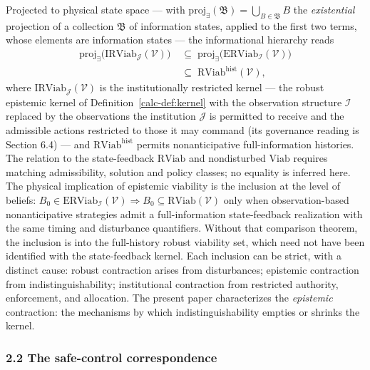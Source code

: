 \documentclass[10pt,twocolumn]{article}
\theoremstyle{definition}
\begin{document}
Projected to physical state space --- with
\(\mathrm{proj}_{\exists}(\mathfrak{B}) = \bigcup_{B \in \mathfrak{B}} B\)
the \emph{existential} projection of a collection \(\mathfrak{B}\) of
information states, applied to the first two terms, whose elements are information states --- the informational hierarchy
reads
\[
\begin{aligned}
\mathrm{proj}_{\exists}\big(\mathrm{IRViab}_{\mathcal{J}}(\mathcal{V})\big)&\;\subseteq\; \mathrm{proj}_{\exists}\big(\mathrm{ERViab}_{\mathcal{I}}(\mathcal{V})\big) \\
&\;\subseteq\; \mathrm{RViab}^{\mathrm{hist}}(\mathcal{V}),
\end{aligned}
\]
where \(\mathrm{IRViab}_{\mathcal{J}}(\mathcal{V})\) is the institutionally restricted kernel --- the robust epistemic kernel of Definition~\ref{calc-def:kernel} with the observation structure \(\mathcal{I}\) replaced by the observations the institution \(\mathcal{J}\) is permitted to receive and the admissible actions restricted to those it may command (its governance reading is Section 6.4) --- and \(\mathrm{RViab}^{\mathrm{hist}}\) permits nonanticipative full-information histories. The relation to the state-feedback \(\mathrm{RViab}\) and nondisturbed \(\mathrm{Viab}\) requires matching admissibility, solution and policy classes; no equality is inferred here. The physical implication of epistemic viability is the
inclusion at the level of beliefs:
\(B_0 \in \mathrm{ERViab}_{\mathcal{I}}(\mathcal{V}) \Rightarrow B_0 \subseteq \mathrm{RViab}(\mathcal{V})\) only when observation-based nonanticipative strategies admit a full-information state-feedback realization with the same timing and disturbance quantifiers. Without that comparison theorem, the inclusion is into the full-history robust viability set, which need not have been identified with the state-feedback kernel.
Each inclusion can be strict, with a distinct cause: robust contraction
arises from disturbances; epistemic contraction from
indistinguishability; institutional contraction from restricted
authority, enforcement, and allocation. The present paper characterizes
the \emph{epistemic} contraction: the mechanisms by which
indistinguishability empties or shrinks the kernel.

\subsubsection{2.2 The safe-control
correspondence}\label{calc-the-safe-control-correspondence}
\end{document}
